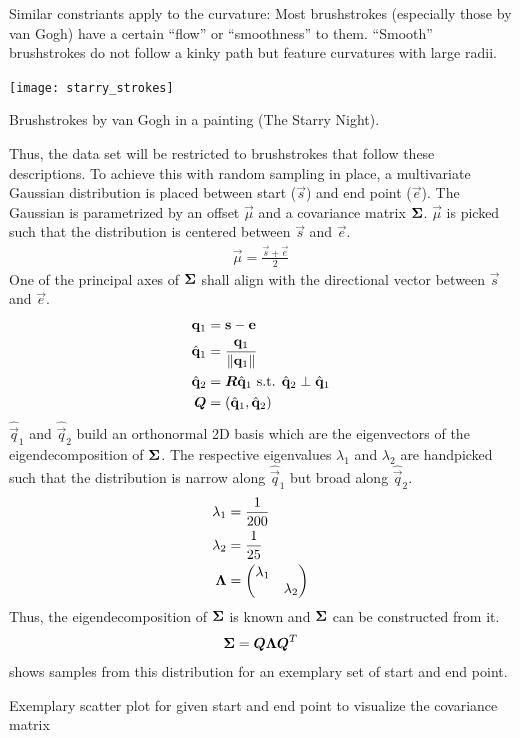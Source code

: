 Similar constriants apply to the curvature:
Most brushstrokes (especially those by van Gogh) have a certain ``flow'' or ``smoothness'' to them.
``Smooth'' brushstrokes do not follow a kinky path but feature curvatures with large radii.\\
\begin{marginfigure}
    \texttt{[image: starry\_strokes]}
    \caption[]{Brushstrokes by van Gogh in a painting (The Starry Night).}
\end{marginfigure}
Thus, the data set will be restricted to brushstrokes that follow these descriptions.
To achieve this with random sampling in place, a multivariate Gaussian distribution is placed between start ($\vec{s}$) and end point ($\vec{e}$).
The Gaussian is parametrized by an offset $\vec{\mu}$ and a covariance matrix $\boldsymbol{\Sigma}$.
$\vec{\mu}$ is picked such that the distribution is centered between $\vec{s}$ and $\vec{e}$.
\begin{align}
    \vec{\mu} = \frac{\vec{s} + \vec{e}}{2}
\end{align}
One of the principal axes of $\boldsymbol{\Sigma}$ shall align with the directional vector between $\vec{s}$ and $\vec{e}$.
\begin{align}
    \mathbf{q}_1 & = \mathbf{s} - \mathbf{e} \\
    \hat{\mathbf{q}}_1 & = \frac{\mathbf{q}_1}{\left\lVert\mathbf{q}_1\right\rVert} \\
    \hat{\mathbf{q}}_2 & = \boldsymbol{R} \hat{\mathbf{q}}_1 \text{ s.t. } \hat{\mathbf{q}}_2 \perp \hat{\mathbf{q}}_1 \\
    \boldsymbol{Q} & = (\hat{\mathbf{q}}_1, \hat{\mathbf{q}}_2)
\end{align}
$\hat{\vec{q}}_1$ and $\hat{\vec{q}}_2$ build an orthonormal 2D basis which are the eigenvectors of the eigendecomposition of $\boldsymbol{\Sigma}$.
The respective eigenvalues $\lambda_1$ and $\lambda_2$ are handpicked such that the distribution is narrow along $\hat{\vec{q}}_1$ but broad along $\hat{\vec{q}}_2$.
\begin{align}
    \lambda_1 & = \frac{1}{200} \\
    \lambda_2 & = \frac{1}{25} \\
    \boldsymbol{\Lambda} & = \begin{pmatrix} \lambda_1 & \\ & \lambda_2 \end{pmatrix}
\end{align}
Thus, the eigendecomposition of $\boldsymbol{\Sigma}$ is known and $\boldsymbol{\Sigma}$ can be constructed from it.
\begin{align}
    \boldsymbol{\Sigma} = \boldsymbol{Q} \boldsymbol{\Lambda} \boldsymbol{Q}^T
\end{align}
 shows samples from this distribution for an exemplary set of start and end point.
\begin{marginfigure}
    \resizebox{\textwidth}{!}{
        
    }
    \caption[]{Exemplary scatter plot for given start and end point to visualize the covariance matrix}
\end{marginfigure}

